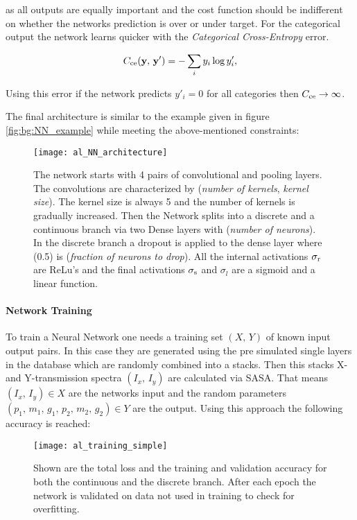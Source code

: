 \noindent
as all outputs are equally important and the cost function should be indifferent on whether the networks prediction is over or under target. For the categorical output the network learns quicker with the \textit{Categorical Cross-Entropy} error.

\begin{equation}
    C_{\mathrm{ce}}(\vb y, \, \vb y') = - \sum_i y_i \log y'_i,
\end{equation}

\noindent
Using this error if the network predicts $y'_i = 0$ for all categories then $C_{\mathrm{ce}} \rightarrow \infty$. 

The final architecture is similar to the example given in figure \ref{fig:bg:NN_example} while meeting the above-mentioned constraints:

\begin{figure}[H]
    \centering
    \texttt{[image: al\_NN\_architecture]}
    \caption{The network starts with 4 pairs of convolutional and pooling layers. The convolutions are characterized by (\textit{number of kernels}, \textit{kernel size}). The kernel size is always 5 and the number of kernels is gradually increased. Then the Network splits into a discrete and a continuous branch via two Dense layers with (\textit{number of neurons}). In the discrete branch a dropout is applied to the dense layer where (0.5) is (\textit{fraction of neurons to drop}).
    All the internal activations $\sigma_{\mathrm{r}}$ are ReLu's and the final activations $\sigma_{\mathrm{s}}$ and $\sigma_{l}$ are a sigmoid and a linear function.}
    \label{fig:al:NN_architecture}
\end{figure}

\newpage
\paragraph{Network Training}
To train a Neural Network one needs a training set $(X, \, Y)$ of known input output pairs. In this case they are generated using the pre simulated single layers in the database which are randomly combined into a stacks. Then this stacks X- and Y-transmission spectra $(I_x, \, I_y)$ are calculated via SASA.
That means $(I_x, \, I_y) \in X$ are the networks input and the random parameters $(p_1, \, m_1, \, g_1, \, p_2, \, m_2, \, g_2) \in Y$ are the output.
Using this approach the following accuracy is reached:

\begin{figure}[H]
    \centering
    \texttt{[image: al\_training\_simple]}
    \caption{ Shown are the total loss and the training and validation accuracy for both the continuous and the discrete branch. After each epoch the network is validated on data not used in training to check for overfitting.}
    \label{}
\end{figure}

